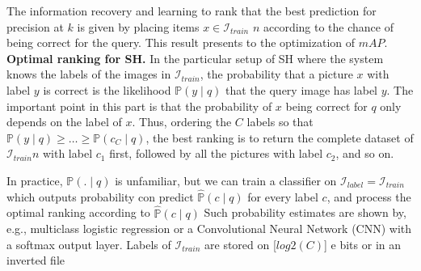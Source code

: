 \documentclass{article}
\begin{document}
The information recovery \cite{doi:10.1108/eb026647} and learning to rank that the best prediction for precision at $k$ is given by placing items $x \in \mathcal{I}_{train}$  $n$ according to the chance of being correct for the query. This result presents to the optimization of $mAP$.
\\
\textbf{Optimal ranking for SH.} In the particular setup of SH where the system knows the labels of the images in $\mathcal{I}_{train}$, the probability that a picture $x$ with label $y$ is correct is the likelihood $\mathbb{P}(y\mid q)$ that the query image has label $y$. The important point in this part is that the probability of $x$ being correct for $q$ only depends on the label of $x$. Thus, ordering the $C$ labels so that $\mathbb{P}(y\mid q)\geq \dots \geq\mathbb{P}(c_C\mid q)$, the best ranking is to return the complete dataset of $\mathcal{I}_{train}n$ with label $c_1$ first, followed by all the pictures with label $c_2$, and so on.
\\

In practice, $\mathbb{P}(.\mid q)$ is unfamiliar, but we can train a classifier on $\mathcal{I}_{label} = \mathcal{I}_{train}$ which outputs probability con predict $\hat{\mathbb{P}}(c\mid q)$ for every label $c$, and process the optimal ranking according to $\hat{\mathbb{P}}(c\mid q)$ Such probability estimates are shown by, e.g., multiclass logistic regression or a Convolutional Neural Network (CNN) with a softmax output layer. Labels of $ \mathcal{I}_{train}$ are stored on [$log2 (C)$] e bits or in an inverted file
\end{document}
